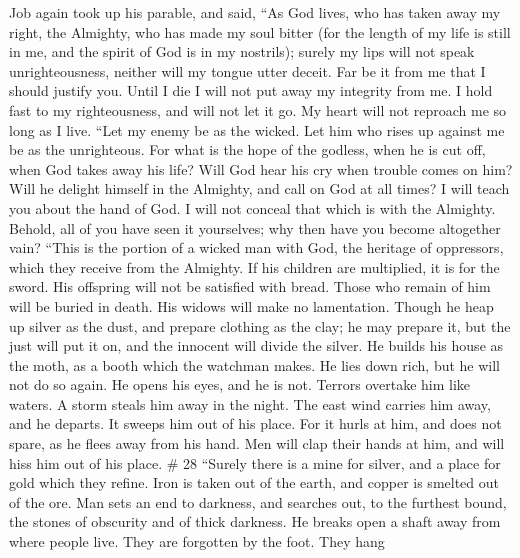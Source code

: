  Job again took up his parable, and said, 
``As God lives, who has taken away my right, the Almighty, who has made
my soul bitter  (for the length of my life is still in me,
and the spirit of God is in my nostrils);  surely my lips
will not speak unrighteousness, neither will my tongue utter deceit.
 Far be it from me that I should justify you. Until I die
I will not put away my integrity from me.  I hold fast to
my righteousness, and will not let it go. My heart will not reproach me
so long as I live.  ``Let my enemy be as the wicked. Let
him who rises up against me be as the unrighteous.  For
what is the hope of the godless, when he is cut off, when God takes away
his life?  Will God hear his cry when trouble comes on
him?  Will he delight himself in the Almighty, and call
on God at all times?  I will teach you about the hand of
God. I will not conceal that which is with the Almighty. 
Behold, all of you have seen it yourselves; why then have you become
altogether vain?  ``This is the portion of a wicked man
with God, the heritage of oppressors, which they receive from the
Almighty.  If his children are multiplied, it is for the
sword. His offspring will not be satisfied with bread. 
Those who remain of him will be buried in death. His widows will make no
lamentation.  Though he heap up silver as the dust, and
prepare clothing as the clay;  he may prepare it, but the
just will put it on, and the innocent will divide the silver.
 He builds his house as the moth, as a booth which the
watchman makes.  He lies down rich, but he will not do so
again. He opens his eyes, and he is not.  Terrors
overtake him like waters. A storm steals him away in the night.
 The east wind carries him away, and he departs. It
sweeps him out of his place.  For it hurls at him, and
does not spare, as he flees away from his hand.  Men will
clap their hands at him, and will hiss him out of his place. \# 28
 ``Surely there is a mine for silver, and a place for gold
which they refine.  Iron is taken out of the earth, and
copper is smelted out of the ore.  Man sets an end to
darkness, and searches out, to the furthest bound, the stones of
obscurity and of thick darkness.  He breaks open a shaft
away from where people live. They are forgotten by the foot. They hang
